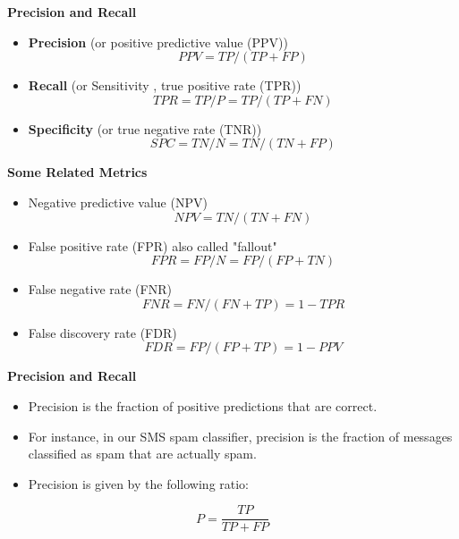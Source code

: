 \documentclass[PredictiveAnalytics101.tex]{subfiles}
\begin{document}
\begin{frame}
\Large
\textbf{Precision and Recall}
\begin{itemize}
\item \textbf{Precision} (or positive predictive value (PPV))
\[\mathit{PPV} = \mathit{TP} / (\mathit{TP} + \mathit{FP}) \]

\item \textbf{Recall} (or Sensitivity , true positive rate (TPR))
\[ \mathit{TPR} = \mathit{TP} / P = \mathit{TP} / (\mathit{TP}+\mathit{FN})  \]

\bigskip
\item \textbf{Specificity} (or true negative rate (TNR))
\[\mathit{SPC} = \mathit{TN} / N = \mathit{TN} / (\mathit{TN}+\mathit{FP}) \]
\end{itemize}


\end{frame}
\begin{frame}
\Large
\textbf{ Some Related Metrics}
\begin{itemize}
\item Negative predictive value (NPV)
\[\mathit{NPV} = \mathit{TN} / (\mathit{TN} + \mathit{FN}) \]
\item False positive rate (FPR) also called "fallout"
\[\mathit{FPR} = \mathit{FP} / N = \mathit{FP} / (\mathit{FP} + \mathit{TN}) \]
\item False negative rate (FNR)
\[\mathit{FNR} = \mathit{FN} / (\mathit{FN} + \mathit{TP}) = 1 - \mathit{TPR} \]
\item False discovery rate (FDR)
\[\mathit{FDR} = \mathit{FP} / (\mathit{FP} + \mathit{TP}) = 1 - \mathit{PPV} \]

\end{itemize}

\end{frame}
\begin{frame}
\Large
\textbf{Precision and Recall}

\begin{itemize}
\item Precision is the
fraction of positive predictions that are correct. 
\item For instance, in our SMS spam
classifier, precision is the fraction of messages classified as spam that are actually
spam. 
\item Precision is given by the following ratio:
\end{itemize}

\[ P = \frac{TP}{TP + FP} \]
\end{frame}
\end{document}
